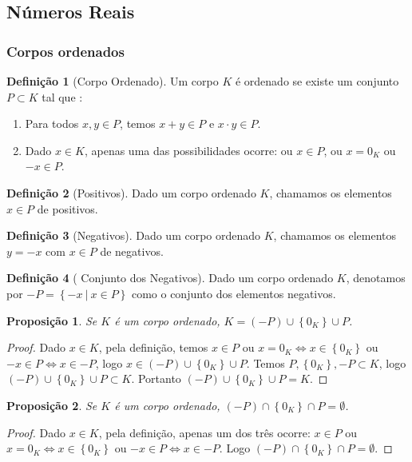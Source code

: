 \documentclass{article}
\theoremstyle{plain}
\newtheorem{prop}{Proposição}[section]
\theoremstyle{definition}
\newtheorem{definicao}{Definição}[section]
\theoremstyle{remark}
\begin{document}
\subsection{ Números Reais}
   \subsubsection{Corpos ordenados}
\begin{definicao}[Corpo Ordenado]
	Um corpo $K$ é ordenado se existe um conjunto $P\subset K$ tal que :
	\begin{enumerate}
		\item Para todos $x,y\in P$, temos $x+y\in P$ e $x\cdot y \in P$.
		\item Dado $x\in K$, apenas uma das possibilidades ocorre: ou $x \in P$, ou $x = 0_K $ ou $-x\in P$.
	\end{enumerate}
\end{definicao}
\begin{definicao}[Positivos]
	Dado um corpo ordenado $K$, chamamos os elementos $x\in P$ de positivos.
\end{definicao}
\begin{definicao}[Negativos]
	Dado um corpo ordenado $K$, chamamos os elementos $ y = -x$ com  $x\in P$ de negativos.
\end{definicao}
\begin{definicao}[ Conjunto dos Negativos]
	Dado um corpo ordenado $K$, denotamos por $-P = \left\{ -x \: | \: x\in P\right\}$ como o conjunto dos elementos negativos.
\end{definicao}
\begin{prop}
	Se $K$ é um corpo ordenado, $K = (-P) \cup \left\{ 0_K \right\} \cup P$.
\end{prop}
\begin{proof}
	Dado $x\in K$, pela definição, temos $x \in P$ ou $x = 0_K \iff x\in \left\{0_K\right\}$ ou $-x\in P \iff x \in -P$, logo $x\in (-P) \cup \left\{ 0_K \right\} \cup P$. Temos $P,\left\{0_K\right\}, -P \subset K$, logo $(-P) \cup \left\{ 0_K \right\} \cup P \subset K$. Portanto $(-P) \cup \left\{ 0_K \right\} \cup P = K$.
\end{proof}
\begin{prop}
	Se $K$ é um corpo ordenado, $(-P) \cap \left\{ 0_K \right\} \cap P = \emptyset$.
\end{prop}
\begin{proof}
	Dado $x\in K$, pela definição, apenas um dos três ocorre: $x \in P$ ou $x = 0_K \iff x\in \left\{0_K\right\}$ ou $-x\in P \iff x \in -P$. Logo $(-P) \cap \left\{ 0_K \right\} \cap P = \emptyset$.
\end{proof}
\end{document}
